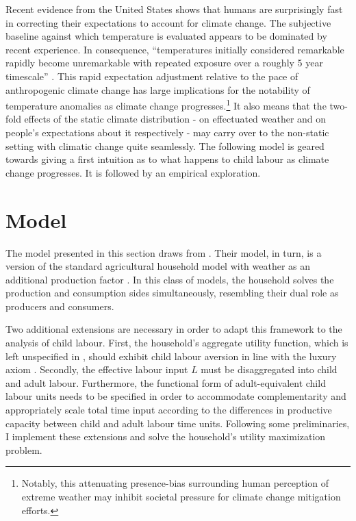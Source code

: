 \documentclass[a4paper,12pt]{article}
\theoremstyle{plain}
\theoremstyle{definition}
\theoremstyle{definition}
\theoremstyle{definition}
\theoremstyle{definition}
\begin{document}
Recent evidence from the United States shows that humans are surprisingly fast in correcting their expectations to account for climate change. The subjective baseline against which temperature is evaluated appears to be dominated by recent experience. In consequence, ``temperatures initially considered remarkable rapidly become unremarkable with repeated exposure over a roughly 5 year timescale'' \citep{Moore2019}. This rapid expectation adjustment relative to the pace of anthropogenic climate change has large implications for the notability of temperature anomalies as climate change progresses.\footnote{Notably, this attenuating presence-bias surrounding human perception of extreme weather may inhibit societal pressure for climate change mitigation efforts.} It also means that the two-fold effects of the static climate distribution - on effectuated weather and on people's expectations about it respectively - may carry over to the non-static setting with climatic change quite seamlessly. The following model is geared towards giving a first intuition as to what happens to child labour as climate change progresses. It is followed by an empirical exploration.

\section{Model}
\label{sec:model}

The model presented in this section draws from \citet{Jessoe2018}. Their model, in turn, is a version of the standard agricultural household model \citep{Singgh1986} with weather as an additional production factor \citep[as in][]{ravallion1988}. In this class of models, the household solves the production and consumption sides simultaneously, resembling their dual role as producers and consumers.

Two additional extensions are necessary in order to adapt this framework to the analysis of child labour. First, the household's aggregate utility function, which is left unspecified in 
\citet{Jessoe2018}, should exhibit child labour aversion in line with the luxury axiom \citep{Basu1998}. Secondly, the effective labour input $L$ must be disaggregated into child and adult labour. Furthermore, the functional form of adult-equivalent child labour units needs to be specified in order to accommodate complementarity and appropriately scale total time input according to the differences in productive capacity between child and adult labour time units. Following some preliminaries, I implement these extensions and solve the household's utility maximization problem.
\end{document}
